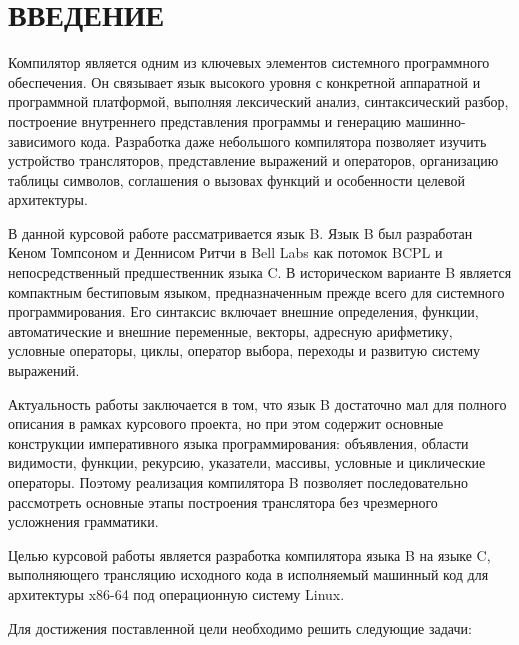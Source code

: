 \maketableofcontents

\chapter*{ВВЕДЕНИЕ}

Компилятор является одним из ключевых элементов системного программного обеспечения. Он связывает язык высокого уровня с конкретной аппаратной и программной платформой, выполняя лексический анализ, синтаксический разбор, построение внутреннего представления программы и генерацию машинно-зависимого кода. Разработка даже небольшого компилятора позволяет изучить устройство трансляторов, представление выражений и операторов, организацию таблицы символов, соглашения о вызовах функций и особенности целевой архитектуры.

В данной курсовой работе рассматривается язык B. Язык B был разработан Кеном Томпсоном и Деннисом Ритчи в Bell Labs как потомок BCPL и непосредственный предшественник языка C. В историческом варианте B является компактным бестиповым языком, предназначенным прежде всего для системного программирования. Его синтаксис включает внешние определения, функции, автоматические и внешние переменные, векторы, адресную арифметику, условные операторы, циклы, оператор выбора, переходы и развитую систему выражений.

Актуальность работы заключается в том, что язык B достаточно мал для полного описания в рамках курсового проекта, но при этом содержит основные конструкции императивного языка программирования: объявления, области видимости, функции, рекурсию, указатели, массивы, условные и циклические операторы. Поэтому реализация компилятора B позволяет последовательно рассмотреть основные этапы построения транслятора без чрезмерного усложнения грамматики.

Целью курсовой работы является разработка компилятора языка B на языке C, выполняющего трансляцию исходного кода в исполняемый машинный код для архитектуры x86-64 под операционную систему Linux.

Для достижения поставленной цели необходимо решить следующие задачи:

